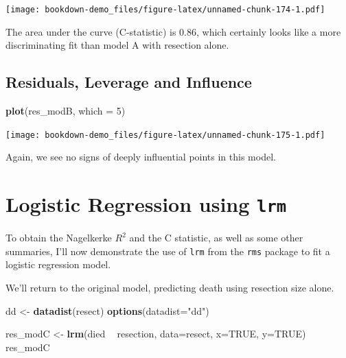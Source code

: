 \documentclass[]{book}
\newenvironment{Shaded}{\begin{snugshade}}{\end{snugshade}}
\newcommand{\KeywordTok}[1]{\textcolor[rgb]{0.13,0.29,0.53}{\textbf{#1}}}
\newcommand{\DataTypeTok}[1]{\textcolor[rgb]{0.13,0.29,0.53}{#1}}
\newcommand{\DecValTok}[1]{\textcolor[rgb]{0.00,0.00,0.81}{#1}}
\newcommand{\StringTok}[1]{\textcolor[rgb]{0.31,0.60,0.02}{#1}}
\newcommand{\OtherTok}[1]{\textcolor[rgb]{0.56,0.35,0.01}{#1}}
\newcommand{\OperatorTok}[1]{\textcolor[rgb]{0.81,0.36,0.00}{\textbf{#1}}}
\newcommand{\NormalTok}[1]{#1}
\theoremstyle{definition}
\theoremstyle{definition}
\theoremstyle{definition}
\theoremstyle{remark}
\begin{document}
\texttt{[image: bookdown-demo\_files/figure-latex/unnamed-chunk-174-1.pdf]}

The area under the curve (C-statistic) is 0.86, which certainly looks
like a more discriminating fit than model A with resection alone.

\subsection{Residuals, Leverage and
Influence}\label{residuals-leverage-and-influence}

\begin{Shaded}
\begin{Highlighting}[]
\KeywordTok{plot}\NormalTok{(res_modB, }\DataTypeTok{which =} \DecValTok{5}\NormalTok{)}
\end{Highlighting}
\end{Shaded}

\texttt{[image: bookdown-demo\_files/figure-latex/unnamed-chunk-175-1.pdf]}

Again, we see no signs of deeply influential points in this model.

\section{\texorpdfstring{Logistic Regression using
\texttt{lrm}}{Logistic Regression using lrm}}\label{logistic-regression-using-lrm}

To obtain the Nagelkerke \(R^2\) and the C statistic, as well as some
other summaries, I'll now demonstrate the use of \texttt{lrm} from the
\texttt{rms} package to fit a logistic regression model.

We'll return to the original model, predicting death using resection
size alone.

\begin{Shaded}
\begin{Highlighting}[]
\NormalTok{dd <-}\StringTok{ }\KeywordTok{datadist}\NormalTok{(resect)}
\KeywordTok{options}\NormalTok{(}\DataTypeTok{datadist=}\StringTok{"dd"}\NormalTok{)}

\NormalTok{res_modC <-}\StringTok{ }\KeywordTok{lrm}\NormalTok{(died }\OperatorTok{~}\StringTok{ }\NormalTok{resection, }\DataTypeTok{data=}\NormalTok{resect, }\DataTypeTok{x=}\OtherTok{TRUE}\NormalTok{, }\DataTypeTok{y=}\OtherTok{TRUE}\NormalTok{)}
\NormalTok{res_modC}
\end{Highlighting}
\end{Shaded}
\end{document}
